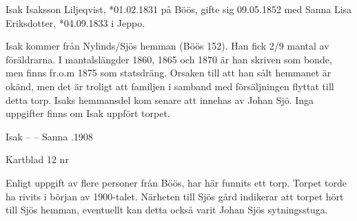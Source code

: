 		Isak Isaksson Liljeqvist,  *01.02.1831 på Böös, gifte sig 09.05.1852
		med Sanna Lisa Eriksdotter,  *04.09.1833 i Jeppo.
    \begin{jhchildren}
      \item {}
      \item {}
      \item {}
      \item {}
      \item {}
      \item {}
      \item {}
      \item {}
      \item {}
      \item {}
    \end{jhchildren}
Isak kommer från Nylinds/Sjös hemman (Böös 152). Han fick 2/9 mantal av föräldrarna. I mantalslängder 1860, 1865 och 1870 är han skriven som bonde, men finns fr.o.m 1875 som statsdräng. Orsaken till att han sålt hemmanet är okänd, men det är troligt att familjen i samband med försäljningen flyttat till detta torp. Isaks hemmansdel kom senare att innehas av Johan Sjö. Inga uppgifter finns om Isak uppfört torpet.

Isak --  --  Sanna .1908


Kartblad 12   nr 

Enligt uppgift av flere personer från Böös, har här funnits ett torp. Torpet torde ha rivits i början av 1900-talet. Närheten till Sjös gård indikerar att torpet hört till Sjös hemman, eventuellt kan detta också varit Johan Sjös sytningsstuga.

